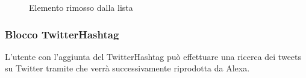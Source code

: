 \begin{itemize}
\begin{enumerate}
\begin{figure}[!ht]
		\caption{Elemento rimosso dalla lista}
		\end{figure}
	\end{enumerate}
\end{itemize}
\newpage
\subsubsection{Blocco TwitterHashtag} \label{twitterHa}
L'utente con l'aggiunta del TwitterHashtag può effettuare una ricerca dei tweets su Twitter tramite che verrà successivamente riprodotta da Alexa.

